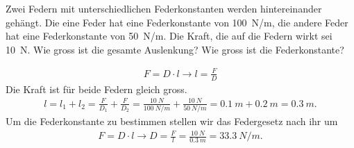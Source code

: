 
\begin{aufgabe}
	Zwei Federn mit unterschiedlichen Federkonstanten werden hintereinander gehängt.
	Die eine Feder hat eine Federkonstante von \SI{100}{N/m}, die andere Feder hat eine Federkonstante von \SI{50}{N/m}.
	Die Kraft, die auf die Federn wirkt sei \SI{10}{N}. Wie gross ist die gesamte Auslenkung? Wie gross ist die Federkonstante?
	\begin{loesung}
		\begin{eqnarray*}
			F=D\cdot l\to l=\frac{F}{D}
		\end{eqnarray*}
Die Kraft ist für beide Federn gleich gross.
\begin{eqnarray*}
	l=l_1+l_2=\frac{F}{D_1}+\frac{F}{D_2}=\frac{\SI{10}{N}}{\SI{100}{N/m}}+\frac{\SI{10}{N}}{\SI{50}{N/m}}=\SI{0.1}{m}+\SI{0.2}{m}=\SI{0.3}{m}\text{.}
\end{eqnarray*}
Um die Federkonstante zu bestimmen stellen wir das Federgesetz nach ihr um
		\begin{eqnarray*}
			F=D\cdot l\to D=\frac{F}{l}=\frac{\SI{10}{N}}{\SI{0.3}{m}}=\SI{33.3}{N/m}\text{.}
		\end{eqnarray*}
	\end{loesung}
\end{aufgabe}

